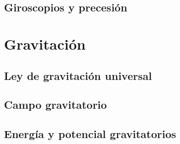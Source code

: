 ﻿\documentclass[11pt,letterpaper,openany]{book}
\newcommand{\rutaraiz}{../..}
\begin{document}




\chapter{Giroscopios y precesión}





\part{Gravitación}



\chapter{Ley de gravitación universal}





\chapter{Campo gravitatorio}





\chapter{Energía y potencial gravitatorios}


\end{document}

